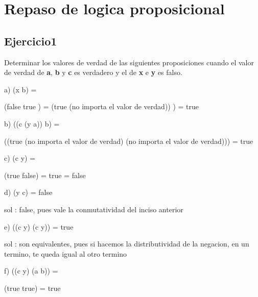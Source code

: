 \documentclass[10pt,a4paper]{article}
\begin{document}
\maketitle

\section{Repaso de logica proposicional}
\subsection{Ejercicio1}

Determinar los valores de verdad de las siguientes proposiciones cuando el valor de verdad de \textbf{a}, \textbf{b} y \textbf{c} es verdadero y el de \textbf{x} e \textbf{y} es falso.

\vspace{0.3cm}

a) (\neg x \vee b) =

(\neg false \vee true ) = (true \vee (no importa el valor de verdad)) ) = true 

\vspace{0.3cm}

b) ((c \vee (y \wedge a)) \vee b) =

((true \vee  (no importa el valor de verdad) \vee (no importa el valor de verdad))) = true  

\vspace{0.3cm}

c) \neg(c \vee y) =

 \neg(true \vee false) = \neg true = false

\vspace{0.3cm}

d) \neg (y \vee c) = false

sol : false, pues vale la conmutatividad del inciso anterior

\vspace{0.3cm}

e) (\neg(c \vee y) \iff (\neg c \wedge \neg y)) = true 

sol : son equivalentes, pues si hacemos la distributividad de la negacion, en un termino, te queda igual al otro termino 

\vspace{0.3cm}

f) ((c \vee y) \wedge (a \vee b)) =

(true \wedge true) = true 

\vspace{0.3cm}
\end{document}

